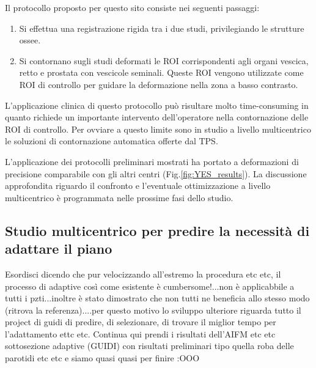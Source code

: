 Il protocollo proposto per questo sito consiste nei seguenti passaggi:
\begin{enumerate}
\item Si effettua una registrazione rigida tra i due studi, privilegiando le strutture ossee.
\item Si contornano sugli studi deformati le ROI corrispondenti agli organi vescica, retto e prostata con vescicole seminali. Queste ROI vengono utilizzate come ROI di controllo per guidare la deformazione nella zona a basso contrasto.
\end{enumerate}
L'applicazione clinica di questo protocollo può risultare molto time-consuming in quanto richiede un importante intervento dell'operatore nella contornazione delle ROI di controllo. Per ovviare a questo limite sono in studio a livello multicentrico le soluzioni di contornazione automatica offerte dal TPS.


L'applicazione dei protocolli preliminari mostrati ha portato a deformazioni di precisione comparabile con gli altri centri (Fig.\ref{fig:YES_results}). La discussione approfondita riguardo il confronto e l'eventuale ottimizzazione a livello multicentrico è programmata nelle prossime fasi dello studio.


\subsection{Studio multicentrico per predire la necessità di adattare il piano}


Esordisci dicendo che pur velocizzando all'estremo la procedura etc etc, il processo di adaptive così come esistente è cumbersome!...non è applicabbile a tutti i pzti...inoltre è stato dimostrato che non tutti ne beneficia allo stesso modo (ritrova la referenza)....per questo motivo lo sviluppo ulteriore riguarda tutto il project di guidi di predire, di selezionare, di trovare il miglior tempo per l'adattamento ettc etc.
Continua qui prendi i risultati dell'AIFM etc etc
sottosezione adaptive (GUIDI) con risultati preliminari tipo quella roba delle parotidi etc etc e siamo quasi quasi per finire :OOO









